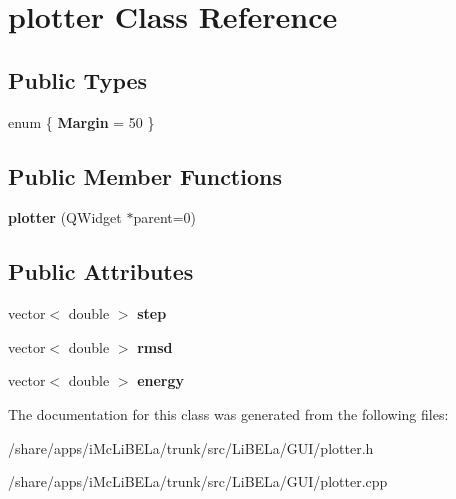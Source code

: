 \hypertarget{classplotter}{
\section{plotter Class Reference}
\label{classplotter}
}
\subsection*{Public Types}
\begin{DoxyCompactItemize}
\item 
enum \{ {\bfseries Margin} =  50
 \}
\end{DoxyCompactItemize}
\subsection*{Public Member Functions}
\begin{DoxyCompactItemize}
\item 
\hypertarget{classplotter_ac2c97e06fd82a35453851f507c366eb7}{
{\bfseries plotter} (QWidget $\ast$parent=0)}
\label{classplotter_ac2c97e06fd82a35453851f507c366eb7}

\end{DoxyCompactItemize}
\subsection*{Public Attributes}
\begin{DoxyCompactItemize}
\item 
\hypertarget{classplotter_a6b06b1ae45726dfae06090d9405d585b}{
vector$<$ double $>$ {\bfseries step}}
\label{classplotter_a6b06b1ae45726dfae06090d9405d585b}

\item 
\hypertarget{classplotter_aef587bde00ca7fbe5dfda370e8c6f7b6}{
vector$<$ double $>$ {\bfseries rmsd}}
\label{classplotter_aef587bde00ca7fbe5dfda370e8c6f7b6}

\item 
\hypertarget{classplotter_a5c4dc7b4898db02183045d9bce431f42}{
vector$<$ double $>$ {\bfseries energy}}
\label{classplotter_a5c4dc7b4898db02183045d9bce431f42}

\end{DoxyCompactItemize}


The documentation for this class was generated from the following files:\begin{DoxyCompactItemize}
\item 
/share/apps/iMcLiBELa/trunk/src/LiBELa/GUI/plotter.h\item 
/share/apps/iMcLiBELa/trunk/src/LiBELa/GUI/plotter.cpp\end{DoxyCompactItemize}
